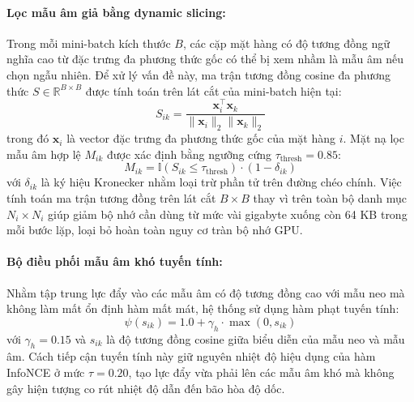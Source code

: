 \paragraph{Lọc mẫu âm giả bằng dynamic slicing:}
Trong mỗi mini-batch kích thước $B$, các cặp mặt hàng có độ tương đồng ngữ nghĩa cao từ đặc trưng đa phương thức gốc có thể bị xem nhầm là mẫu âm nếu chọn ngẫu nhiên. Để xử lý vấn đề này, ma trận tương đồng cosine đa phương thức $S \in \mathbb{R}^{B \times B}$ được tính toán trên lát cắt của mini-batch hiện tại:
\begin{equation}
S_{ik} = \frac{\mathbf{x}_i^\top \mathbf{x}_k}{\|\mathbf{x}_i\|_2 \|\mathbf{x}_k\|_2}
\end{equation}
trong đó $\mathbf{x}_i$ là vector đặc trưng đa phương thức gốc của mặt hàng $i$. Mặt nạ lọc mẫu âm hợp lệ $M_{ik}$ được xác định bằng ngưỡng cứng $\tau_{\text{thresh}} = 0.85$:
\begin{equation}
M_{ik} = \mathbb{I}(S_{ik} \le \tau_{\text{thresh}}) \cdot (1 - \delta_{ik})
\end{equation}
với $\delta_{ik}$ là ký hiệu Kronecker nhằm loại trừ phần tử trên đường chéo chính. Việc tính toán ma trận tương đồng trên lát cắt $B \times B$ thay vì trên toàn bộ danh mục $N_i \times N_i$ giúp giảm bộ nhớ cần dùng từ mức vài gigabyte xuống còn 64 KB trong mỗi bước lặp, loại bỏ hoàn toàn nguy cơ tràn bộ nhớ GPU.

\paragraph{Bộ điều phối mẫu âm khó tuyến tính:}
Nhằm tập trung lực đẩy vào các mẫu âm có độ tương đồng cao với mẫu neo mà không làm mất ổn định hàm mất mát, hệ thống sử dụng hàm phạt tuyến tính:
\begin{equation}
\psi(s_{ik}) = 1.0 + \gamma_h \cdot \max(0, s_{ik})
\end{equation}
với $\gamma_h = 0.15$ và $s_{ik}$ là độ tương đồng cosine giữa biểu diễn của mẫu neo và mẫu âm. Cách tiếp cận tuyến tính này giữ nguyên nhiệt độ hiệu dụng của hàm InfoNCE ở mức $\tau = 0.20$, tạo lực đẩy vừa phải lên các mẫu âm khó mà không gây hiện tượng co rút nhiệt độ dẫn đến bão hòa độ dốc.

